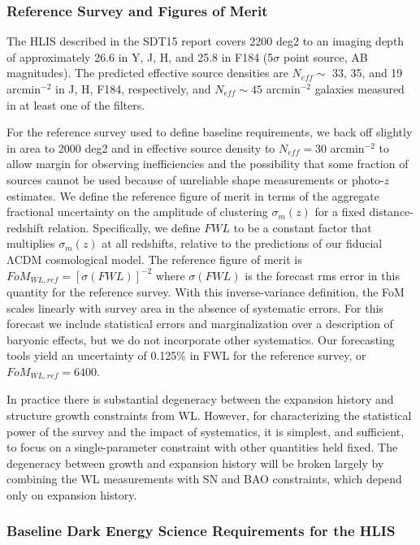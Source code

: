 \subsubsection{Reference Survey and Figures of Merit}

The HLIS described in the SDT15 report covers 2200 deg2  to an imaging depth of
approximately 26.6 in Y, J, H, and 25.8 in F184 (5$\sigma$ point source, AB
magnitudes).  The predicted effective source densities are $N_{eff} \sim$ 33, 35, and 19
arcmin$^{-2}$ in J, H, F184, respectively, and $N_{eff} \sim 45$ arcmin$^{-2}$ galaxies measured
in at least one of the filters.

For the reference survey used to define baseline requirements, we back off
slightly in area to 2000 deg2 and in effective source density to $N_{eff} = 30$
arcmin$^{-2}$ to allow margin for observing inefficiencies and the possibility that
some fraction of sources cannot be used because of unreliable shape measurements
or photo-$z$ estimates.  We define the reference figure of merit in terms of the
aggregate fractional uncertainty on the amplitude of clustering $\sigma_m(z)$ for a
fixed distance-redshift relation.  Specifically, we define $FWL$ to be a constant
factor that multiplies $\sigma_m(z)$ at all redshifts, relative to the predictions of
our fiducial ΛCDM cosmological model.  The reference figure of merit is
$FoM_{WL,ref} = [\sigma(FWL)]^{-2}$ where $\sigma(FWL)$ is the forecast rms error in this quantity for the reference
survey.  With this inverse-variance definition, the FoM scales linearly with
survey area in the absence of systematic errors.  For this forecast we include
statistical errors and marginalization over a description of baryonic effects,
but we do not incorporate other systematics.  Our forecasting tools yield an
uncertainty of 0.125\% in FWL for the reference survey, or $FoM_{WL,ref} = 6400$.

In practice there is substantial degeneracy between the expansion history and
structure growth constraints from WL.  However, for characterizing the
statistical power of the survey and the impact of systematics, it is simplest,
and sufficient, to focus on a single-parameter constraint with other quantities
held fixed.  The degeneracy between growth and expansion history will be broken
largely by combining the WL measurements with SN and BAO constraints, which
depend only on expansion history.

\subsubsection{Baseline  Dark Energy Science Requirements for the HLIS}

